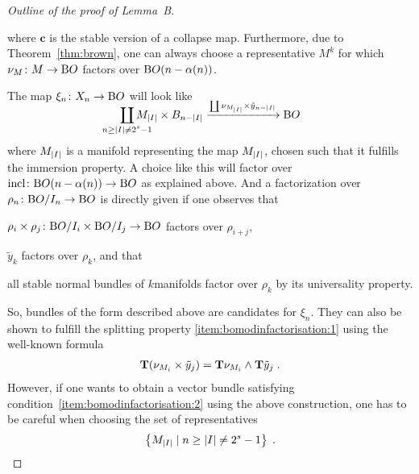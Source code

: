 \begin{proof}[Outline of the proof of Lemma~B]
\begin{description}
    \begin{center}
    \end{center}
    where $\bm{c}$ is the stable version of a collapse map.
    Furthermore, due to Theorem~\ref{thm:brown}, one can always choose
    a representative $M^k$ for which 
    $\nu_{M}\colon M\to\mathrm{B}O$ factors over $\mathrm{B}O(n-\alpha(n))$.
  \end{description}
  The map $\xi_n\colon X_n\to\mathrm{B}O$ will look like
  \begin{gather*}
    \SwapAboveDisplaySkip
    \coprod_{\mathclap{n\geq\Deg{I}\neq 2^s-1}}
    M_{\Deg{I}} \times \BraidSpace{n-\Deg{I}}
    \xrightarrow{\coprod \N{M_{\Deg{I}}} \times \tilde y_{n-\Deg{I}}}
    \BO
  \end{gather*}
  where $M_{\left|I\right|}$ is a manifold representing the map
  $M_{\left|I\right|}$, chosen such that it fulfills the immersion
  property.
  A choice like this will factor over
  $\mathrm{incl}\colon\mathrm{B}O(n-\alpha(n))\to\mathrm{B}O$ as explained above.
  And a factorization over $\rho_n\colon\mathrm{B}O/I_{n}\to\mathrm{B}O$ is directly
  given if one observes that
  \begin{compactitemize}
  \item $\rho_i\times\rho_j\colon\mathrm{B}O/I_{i}\times\mathrm{B}O/I_{j}\to\mathrm{B}O$ factors
    over $\rho_{i+j}$,
  \item $\tilde y_k$ factors over $\rho_k$, and that
  \item all stable normal bundles of $k$\nbd{}manifolds factor over
    $\rho_k$ by its universality property.
  \end{compactitemize}
  So, bundles of the form described above are candidates
  for $\xi_n$.
  They can also be shown to fulfill the splitting
  property \ref{item:bomodinfactorisation:1} using the well-known
  formula
  \begin{gather*}
    \bm{\mathrm{T}}{(\nu_{M_i} \times \tilde y_j)}
    = \bm{\mathrm{T}}{\nu_{M_i}} \wedge \bm{\mathrm{T}}{\tilde y_j}
    \;.
  \end{gather*}
  However, if one wants to obtain a vector bundle satisfying
  condition~\ref{item:bomodinfactorisation:2} using the above
  construction, one has to be careful when choosing the
  set of representatives
  \begin{gather*}
    \left\{ M_{\left|I\right|}\mid n\geq\left|I\right|\neq 2^s-1 \right\}
    \;.
  \end{gather*}

\end{proof}
